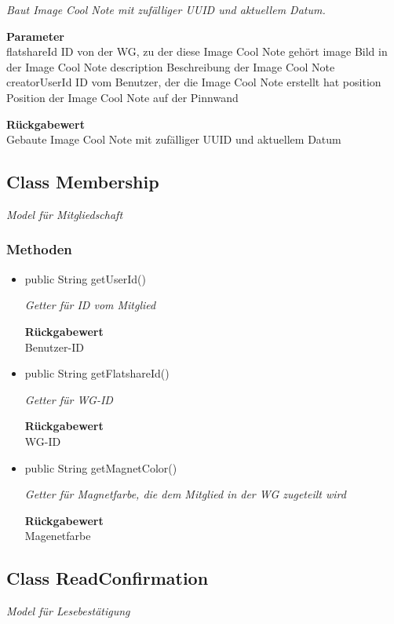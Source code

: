 \documentclass[a4paper]{scrreprt}
\begin{document}
\begin{itemize}
        	\textit{Baut Image Cool Note mit zufälliger UUID und aktuellem Datum.}
        	
        	\textbf{Parameter} \\
        	flatshareId ID von der WG, zu der diese Image Cool Note gehört
        	image Bild in der Image Cool Note
        	description Beschreibung der Image Cool Note
        	creatorUserId ID vom Benutzer, der die Image Cool Note erstellt hat
        	position Position der Image Cool Note auf der Pinnwand
        	
        	\textbf{Rückgabewert} \\
        	Gebaute Image Cool Note mit zufälliger UUID und aktuellem Datum
        \end{itemize}
        \subsection{Class Membership}
        \textit{Model für Mitgliedschaft}
        \subsubsection{Methoden}
        \begin{itemize}
        	\item{public String getUserId()}
        	
        	\textit{Getter für ID vom Mitglied}
        	
        	
        	
        	\textbf{Rückgabewert} \\
        	Benutzer-ID        \item{public String getFlatshareId()}
        	
        	\textit{Getter für WG-ID}
        	
        	
        	
        	\textbf{Rückgabewert} \\
        	WG-ID        \item{public String getMagnetColor()}
        	
        	\textit{Getter für Magnetfarbe, die dem Mitglied in der WG zugeteilt wird}
        	
        	
        	
        	\textbf{Rückgabewert} \\
        	Magenetfarbe
        \end{itemize}
        \subsection{Class ReadConfirmation}
        \textit{Model für Lesebestätigung}
\end{document}
